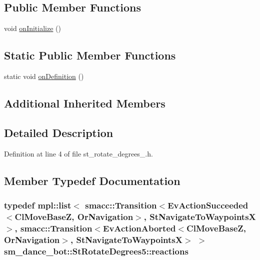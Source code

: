 \subsection*{Public Member Functions}
\begin{DoxyCompactItemize}
\item 
void \hyperlink{structsm__dance__bot_1_1StRotateDegrees5_a7895e3520bfa142aa23cba7c5bffdb73}{on\+Initialize} ()
\end{DoxyCompactItemize}
\subsection*{Static Public Member Functions}
\begin{DoxyCompactItemize}
\item 
static void \hyperlink{structsm__dance__bot_1_1StRotateDegrees5_a26e65c735f1ac950f14b108f51fa3349}{on\+Definition} ()
\end{DoxyCompactItemize}
\subsection*{Additional Inherited Members}


\subsection{Detailed Description}


Definition at line 4 of file st\+\_\+rotate\+\_\+degrees\+\_.\+h.



\subsection{Member Typedef Documentation}
\subsubsection[{\texorpdfstring{reactions}{reactions}}]{\setlength{\rightskip}{0pt plus 5cm}typedef mpl\+::list$<$ {\bf smacc\+::\+Transition}$<$Ev\+Action\+Succeeded$<${\bf Cl\+Move\+BaseZ}, {\bf Or\+Navigation}$>$, {\bf St\+Navigate\+To\+WaypointsX}$>$, {\bf smacc\+::\+Transition}$<$Ev\+Action\+Aborted$<${\bf Cl\+Move\+BaseZ}, {\bf Or\+Navigation}$>$, {\bf St\+Navigate\+To\+WaypointsX}$>$ $>$ {\bf sm\+\_\+dance\+\_\+bot\+::\+St\+Rotate\+Degrees5\+::reactions}}\hypertarget{structsm__dance__bot_1_1StRotateDegrees5_a2b26d5bf7b16e986db05aa5b64d5e88d}{}\label{structsm__dance__bot_1_1StRotateDegrees5_a2b26d5bf7b16e986db05aa5b64d5e88d}


